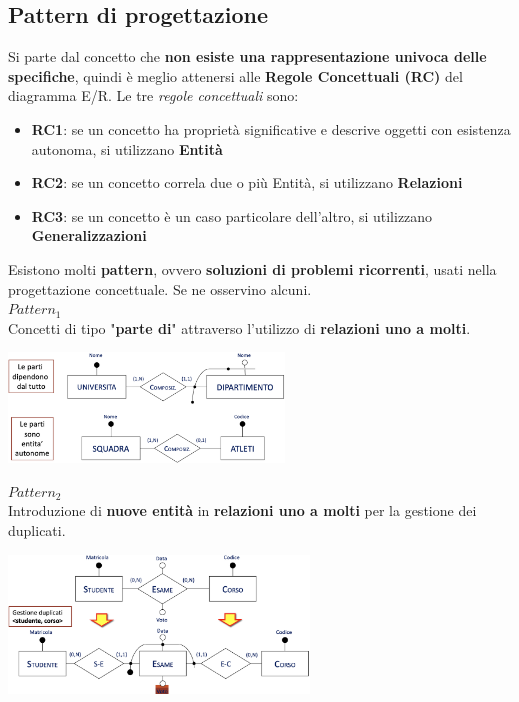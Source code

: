 \documentclass{article}
\begin{document}
\subsection*{Pattern di progettazione}
\large

Si parte dal concetto che \textbf{non esiste una rappresentazione univoca delle specifiche}, quindi è meglio attenersi alle \textbf{Regole Concettuali (RC)} del diagramma E/R. Le tre \textit{regole concettuali} sono:
\begin{itemize}[label={-}, leftmargin=1cm]
    \item \textbf{RC1}: se un concetto ha proprietà significative e descrive oggetti con esistenza autonoma, si utilizzano \textbf{Entità}
    \item \textbf{RC2}: se un concetto correla due o più Entità, si utilizzano \textbf{Relazioni}
    \item \textbf{RC3}: se un concetto è un caso particolare dell'altro, si utilizzano \textbf{Generalizzazioni}
\end{itemize}
Esistono molti \textbf{pattern}, ovvero \textbf{soluzioni di problemi ricorrenti}, usati nella progettazione concettuale. Se ne osservino alcuni.\vspace*{14pt}\\
\textit{$Pattern_1$}\\
Concetti di tipo "\textbf{parte di}" attraverso l'utilizzo di \textbf{relazioni uno a molti}.
\begin{center}
    \includegraphics[width=0.55\textwidth]{foto 4.png}
\end{center}
\textit{$Pattern_2$}\\
Introduzione di \textbf{nuove entità} in \textbf{relazioni uno a molti} per la gestione dei duplicati.
\begin{center}
    \includegraphics[width=0.6\textwidth]{foto 5.png}
\end{center}
\end{document}
